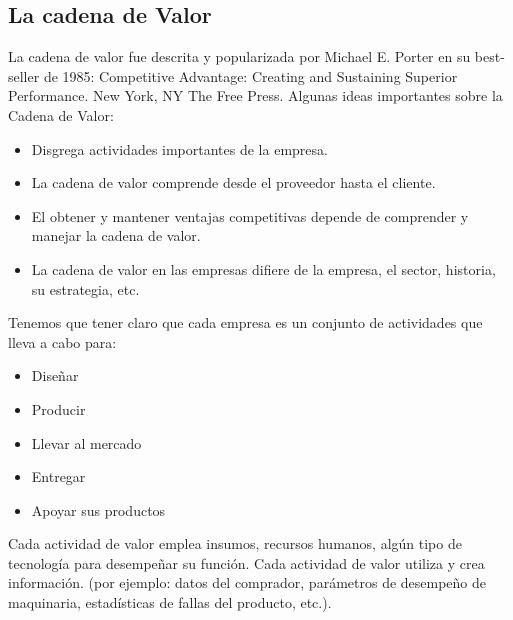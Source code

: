 \subsection*{La cadena de Valor}

La cadena de valor fue descrita y popularizada por Michael E. Porter en su best-seller de 1985: Competitive Advantage: Creating and Sustaining Superior Performance. New York, NY The Free Press.
Algunas ideas importantes sobre la Cadena de Valor:
\begin{itemize}
	\item Disgrega actividades importantes de la empresa.
	\item La cadena de valor comprende desde el proveedor hasta el cliente.
	\item El obtener y mantener ventajas competitivas depende de comprender y manejar la cadena de valor.
	\item La cadena de valor en las empresas difiere de la empresa, el sector, historia, su estrategia, etc.
\end{itemize}
Tenemos que tener claro que cada empresa es un conjunto de actividades que lleva a cabo para:
\begin{itemize}
	\item Diseñar
	\item Producir
	\item Llevar al mercado
	\item Entregar
	\item Apoyar sus productos
\end{itemize}

Cada actividad de valor emplea insumos, recursos humanos, algún tipo de tecnología para desempeñar su función.
Cada actividad de valor utiliza y crea información. (por ejemplo: datos del comprador, parámetros de desempeño de maquinaria, estadísticas de fallas del producto, etc.).

